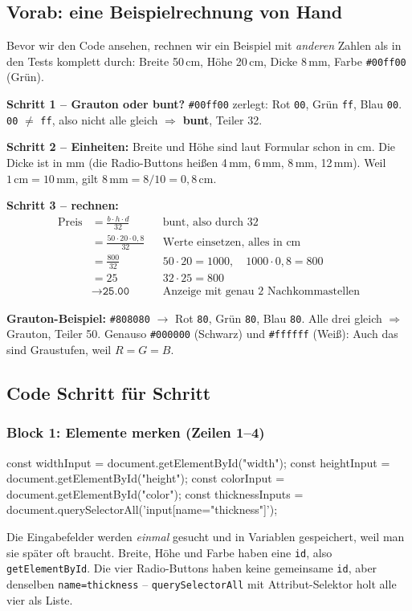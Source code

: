 \documentclass[a4paper,11pt]{article}
\begin{document}
\subsection{Vorab: eine Beispielrechnung von Hand}

Bevor wir den Code ansehen, rechnen wir ein Beispiel mit \emph{anderen} Zahlen als in den Tests komplett durch:
Breite 50\,cm, Höhe 20\,cm, Dicke 8\,mm, Farbe \texttt{\#00ff00} (Grün).

\textbf{Schritt 1 -- Grauton oder bunt?} \texttt{\#00ff00} zerlegt: Rot \texttt{00}, Grün \texttt{ff}, Blau \texttt{00}.
\texttt{00} $\neq$ \texttt{ff}, also nicht alle gleich $\Rightarrow$ \textbf{bunt}, Teiler 32.

\textbf{Schritt 2 -- Einheiten:} Breite und Höhe sind laut Formular schon in cm. Die Dicke ist in mm
(die Radio-Buttons heißen 4\,mm, 6\,mm, 8\,mm, 12\,mm). Weil $1\,\text{cm} = 10\,\text{mm}$, gilt
$8\,\text{mm} = 8 / 10 = 0{,}8\,\text{cm}$.

\textbf{Schritt 3 -- rechnen:}
\begin{align*}
\text{Preis} &= \frac{b \cdot h \cdot d}{32} && \text{bunt, also durch 32}\\
&= \frac{50 \cdot 20 \cdot 0{,}8}{32} && \text{Werte einsetzen, alles in cm}\\
&= \frac{800}{32} && 50 \cdot 20 = 1000,\quad 1000 \cdot 0{,}8 = 800\\
&= 25 && 32 \cdot 25 = 800\\
&\to \texttt{25.00} && \text{Anzeige mit genau 2 Nachkommastellen}
\end{align*}

\textbf{Grauton-Beispiel:} \texttt{\#808080} $\to$ Rot \texttt{80}, Grün \texttt{80}, Blau \texttt{80}. Alle drei gleich
$\Rightarrow$ Grauton, Teiler 50. Genauso \texttt{\#000000} (Schwarz) und \texttt{\#ffffff} (Weiß): Auch das sind
Graustufen, weil $R = G = B$.

\subsection{Code Schritt für Schritt}

\subsubsection*{Block 1: Elemente merken (Zeilen 1--4)}
\begin{code}
const widthInput = document.getElementById("width");
const heightInput = document.getElementById("height");
const colorInput = document.getElementById("color");
const thicknessInputs = document.querySelectorAll('input[name="thickness"]');
\end{code}
Die Eingabefelder werden \emph{einmal} gesucht und in Variablen gespeichert, weil man sie später oft braucht.
Breite, Höhe und Farbe haben eine \texttt{id}, also \texttt{getElementById}. Die vier Radio-Buttons haben
keine gemeinsame \texttt{id}, aber denselben \texttt{name=\textquotedbl{}thickness\textquotedbl{}} -- \texttt{querySelectorAll} mit
Attribut-Selektor holt alle vier als Liste.
\end{document}
